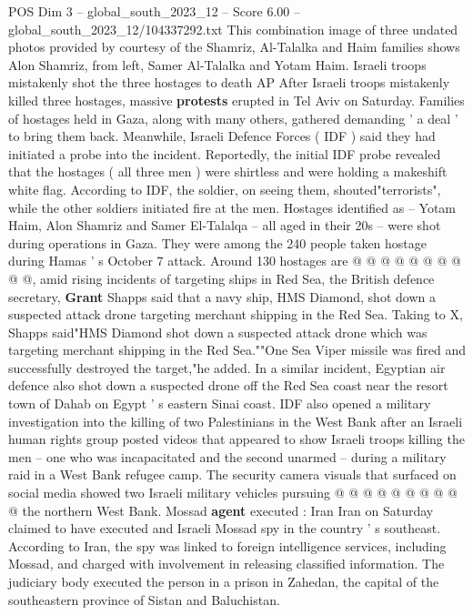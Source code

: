 \begin{textsample}{POS Dim 3 – global\_south\_2023\_12 – Score 6.00 – global\_south\_2023\_12/104337292.txt}  \label{ex:f3_pos_446}
This combination image of three undated photos provided by courtesy of the Shamriz, Al-Talalka and Haim families shows Alon Shamriz, from left, Samer Al-Talalka and Yotam Haim.
Israeli troops mistakenly shot the three hostages to death AP After Israeli troops mistakenly killed three hostages, massive \textbf{protests} erupted in Tel Aviv on Saturday.
Families of hostages held in Gaza, along with many others, gathered demanding ' a deal ' to bring them back.
Meanwhile, Israeli Defence Forces ( IDF ) said they had initiated a probe into the incident.
Reportedly, the initial IDF probe revealed that the hostages ( all three men ) were shirtless and were holding a makeshift white flag.
According to IDF, the soldier, on seeing them, shouted"terrorists", while the other soldiers initiated fire at the men.
Hostages identified as -- Yotam Haim, Alon Shamriz and Samer El-Talalqa -- all aged in their 20s -- were shot during operations in Gaza.
They were among the 240 people taken hostage during Hamas ' s October 7 attack.
Around 130 hostages are @ @ @ @ @ @ @ @ @ @, amid rising incidents of targeting ships in Red Sea, the British defence secretary, \textbf{Grant} Shapps said that a navy ship, HMS Diamond, shot down a suspected attack drone targeting merchant shipping in the Red Sea.
Taking to X, Shapps said"HMS Diamond shot down a suspected attack drone which was targeting merchant shipping in the Red Sea.""One Sea Viper missile was fired and successfully destroyed the target,"he added.
In a similar incident, Egyptian air defence also shot down a suspected drone off the Red Sea coast near the resort town of Dahab on Egypt ' s eastern Sinai coast.
IDF also opened a military investigation into the killing of two Palestinians in the West Bank after an Israeli human rights group posted videos that appeared to show Israeli troops killing the men -- one who was incapacitated and the second unarmed -- during a military raid in a West Bank refugee camp.
The security camera visuals that surfaced on social media showed two Israeli military vehicles pursuing @ @ @ @ @ @ @ @ @ @ the northern West Bank.
Mossad \textbf{agent} executed : Iran Iran on Saturday claimed to have executed and Israeli Mossad spy in the country ' s southeast.
According to Iran, the spy was linked to foreign intelligence services, including Mossad, and charged with involvement in releasing classified information.
The judiciary body executed the person in a prison in Zahedan, the capital of the southeastern province of Sistan and Baluchistan.

\end{textsample}
